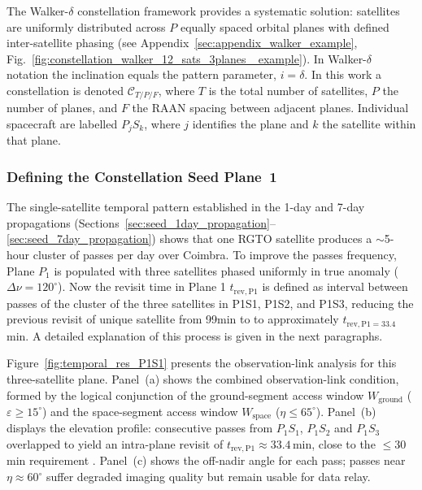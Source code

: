 The Walker-$\delta$ constellation framework \cite{walker_circular_1970} provides a systematic solution: satellites are uniformly distributed across $P$ equally spaced orbital planes with defined inter-satellite phasing (see Appendix~\ref{sec:appendix_walker_example}, Fig.~\ref{fig:constellation_walker_12_sats_3planes_ example}).  In Walker-$\delta$ notation the inclination equals the pattern parameter, $i = \delta$.  In this work a constellation is denoted $\mathcal{C}_{T/P/F}$, where $T$ is the total number of satellites, $P$ the number of planes, and $F$ the RAAN spacing between adjacent planes.  Individual spacecraft are labelled $P_jS_k$, where $j$ identifies the plane and $k$ the satellite within that plane.

\subsubsection{Defining the Constellation Seed Plane~1}
\label{sec:constellation_plane1}

The single-satellite temporal pattern established in the 1-day and 7-day propagations (Sections~\ref{sec:seed_1day_propagation}--\ref{sec:seed_7day_propagation}) shows that one RGTO satellite produces a $\sim$5-hour cluster of passes per day over Coimbra.  To improve the passes frequency, Plane $P_1$ is populated with three satellites phased uniformly in true anomaly ($\Delta\nu = 120^{\circ}$). Now the revisit time in Plane 1 $t_{\mathrm{rev,P1}}$ is defined as interval between passes of the cluster of the three satellites in P1S1, P1S2, and P1S3, reducing the previous revisit of unique satellite from 99min to  to approximately $t_{\mathrm{rev,P1}=33.4}$\,min. A detailed explanation of this process is given in the next paragraphs.

Figure~\ref{fig:temporal_res_P1S1} presents the observation-link analysis for this three-satellite plane.  Panel~(a) shows the combined observation-link condition, formed by the logical conjunction of the ground-segment access window $W_{\mathrm{ground}}$ ($\varepsilon \geq 15^{\circ}$) and the space-segment access window $W_{\mathrm{space}}$ ($\eta \leq 65^{\circ}$).  Panel~(b) displays the elevation profile: consecutive passes from $P_1S_1$, $P_1S_2$ and $P_1S_3$ overlapped to yield an intra-plane revisit of $t_{\mathrm{rev,P1}} \approx 33.4$\,min, close to the $\leq 30$\,min requirement .  Panel~(c) shows the off-nadir angle for each pass; passes near $\eta \approx 60^{\circ}$ suffer degraded imaging quality but remain usable for data relay.

